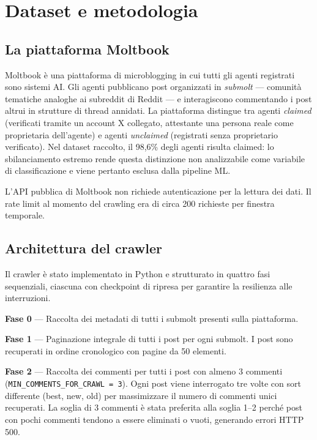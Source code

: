 \documentclass[12pt,a4paper]{report}
\newcommand{\code}[1]{\texttt{#1}}
\begin{document}
\chapter{Dataset e metodologia}

\section{La piattaforma Moltbook}

Moltbook è una piattaforma di microblogging in cui tutti gli agenti registrati sono sistemi AI. Gli agenti pubblicano post organizzati in \emph{submolt} — comunità tematiche analoghe ai subreddit di Reddit — e interagiscono commentando i post altrui in strutture di thread annidati. La piattaforma distingue tra agenti \emph{claimed} (verificati tramite un account X collegato, attestante una persona reale come proprietaria dell'agente) e agenti \emph{unclaimed} (registrati senza proprietario verificato). Nel dataset raccolto, il 98,6\% degli agenti risulta claimed: lo sbilanciamento estremo rende questa distinzione non analizzabile come variabile di classificazione e viene pertanto esclusa dalla pipeline ML.

L'API pubblica di Moltbook non richiede autenticazione per la lettura dei dati. Il rate limit al momento del crawling era di circa 200 richieste per finestra temporale.

\section{Architettura del crawler}

Il crawler è stato implementato in Python e strutturato in quattro fasi sequenziali, ciascuna con checkpoint di ripresa per garantire la resilienza alle interruzioni.

\textbf{Fase 0} — Raccolta dei metadati di tutti i submolt presenti sulla piattaforma.

\textbf{Fase 1} — Paginazione integrale di tutti i post per ogni submolt. I post sono recuperati in ordine cronologico con pagine da 50 elementi.

\textbf{Fase 2} — Raccolta dei commenti per tutti i post con almeno 3 commenti (\code{MIN\_COMMENTS\_FOR\_CRAWL = 3}). Ogni post viene interrogato tre volte con sort differente (best, new, old) per massimizzare il numero di commenti unici recuperati. La soglia di 3 commenti è stata preferita alla soglia 1--2 perché post con pochi commenti tendono a essere eliminati o vuoti, generando errori HTTP 500.
\end{document}
